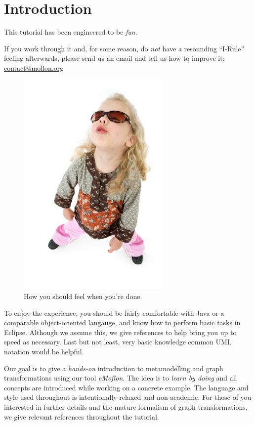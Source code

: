 \chapter{Introduction}
\label{chap:introduction}

This tutorial has been engineered to be \emph{fun}.

If you work through it and, for some reason, do \emph{not} have a resounding
``I-Rule'' feeling afterwards, please send us an email and tell us how to improve it:
\url{contact@moflon.org}

\begin{figure}[htp]
\begin{center}
  \includegraphics[height=0.45\textheight]{pics/i-rule}
  \caption{How you should feel when you're done.}
  \label{i-rule}
\end{center}
\end{figure}

\newpage

To enjoy the experience, you should be fairly comfortable with Java or
a comparable object-oriented langauge, and know how to perform basic tasks
in Eclipse.  Although we assume this, we give references to help bring you up to
speed as necessary.  Last but not least, very basic knowledge
common UML notation would be helpful.

Our goal is to give a \emph{hands-on} introduction to metamodelling and graph
transformations using our tool \emph{eMoflon}.
The idea is to \emph{learn by doing} and all concepts are introduced while
working on a concrete example.
The language and style used throughout is intentionally relaxed and
non-academic.
For those of you interested in further details and the mature
formalism of graph transformations, we give relevant references throughout the
tutorial.

